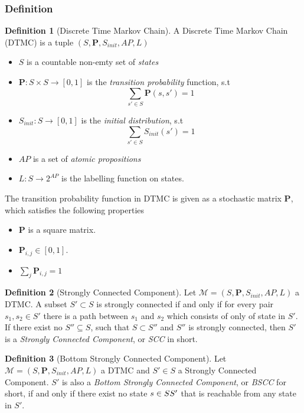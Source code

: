 \documentclass[12pt]{article}
\theoremstyle{definition}
\newtheorem{definition}{Definition}[section]
\begin{document}
\subsubsection{Definition}
\begin{definition}[Discrete Time Markov Chain]
  A Discrete Time Markov Chain (DTMC) is a tuple $(S,\mathbf{P}, S_{init}, AP,
  L)$ \cite{baier2008principles} 
  \begin{itemize}
  \item $S$ is a countable non-emty set of \textit{states}
  \item $\mathbf{P}:S\times S \rightarrow [0,1]$ is the \textit{transition probability}
    function, s.t $$\sum_{s'\in S}\mathbf{P}(s, s') = 1$$
  \item $S_{init}: S \rightarrow [0,1]$ is the \textit{initial distribution},
    s.t  $$\sum_{s'\in S}S_{init}(s') = 1$$
  \item $AP$ is a set of \textit{atomic propositions}
  \item $L: S \rightarrow 2^{AP}$ is the labelling function on states.
  \end{itemize}
\end{definition}

The transition probability function in DTMC is given as a stochastic matrix $\mathbf{P}$,
which satisfies the following properties
\begin{itemize}
\item $\mathbf{P}$ is a square matrix.
\item $\mathbf{P}_{i,j} \in [0,1]$.
\item $\sum_j\mathbf{P}_{i,j} = 1$
\end{itemize}

\begin{definition}[Strongly Connected Component]
  Let $\mathcal{M}=(S,\mathbf{P}, S_{init}, AP,L)$ a DTMC. A subset $S'\subset
  S$ is strongly connected if and only if for every pair $s_1,s_2\in S'$ there
  is a path between $s_1$ and $s_2$ which consists of only of state in $S'$. If
  there exist no $S''\subseteq S$, such that $S\subset S''$ and $S''$ is
  strongly connected, then $S'$ is a \textit{Strongly Connected Component}, or
  \textit{SCC} in short.
\end{definition}

\begin{definition}[Bottom Strongly Connected Component]
  Let $\mathcal{M}=(S,\mathbf{P}, S_{init}, AP,L)$ a DTMC and $S'\in S$ a
  Strongly Connected Component. $S'$ is also a \textit{Bottom Strongly Connected
    Component}, or \textit{BSCC} for short, if and only if there exist no state
  $s \in S\\S'$ that is reachable from any state in $S'$.
\end{definition}
\end{document}
